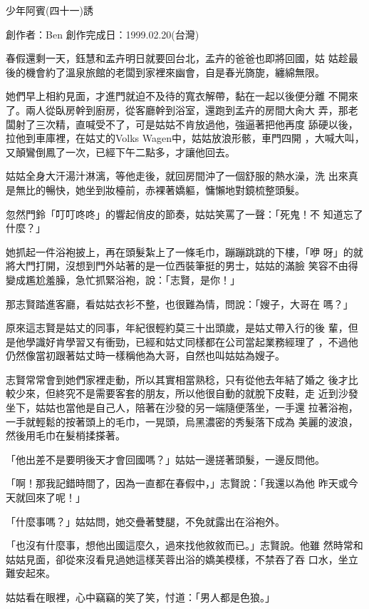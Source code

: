 



少年阿賓(四十一)誘

創作者：Ben
創作完成日：1999.02.20(台灣)


春假還剩一天，鈺慧和孟卉明日就要回台北，孟卉的爸爸也即將回國，姑
姑趁最後的機會約了溫泉旅館的老闆到家裡來幽會，自是春光旖旎，纏綿無限。

她們早上相約見面，才進門就迫不及待的寬衣解帶，黏在一起以後便分離
不開來了。兩人從臥房幹到廚房，從客廳幹到浴室，還跑到孟卉的房間大肏大
弄，那老闆射了三次精，直喊受不了，可是姑姑不肯放過他，強逼著把他再度
舔硬以後，拉他到車庫裡，在姑丈的Volks Wagen中，姑姑放浪形骸，車門四開
，大喊大叫，又顛鸞倒鳳了一次，已經下午二點多，才讓他回去。

姑姑全身大汗湯汁淋漓，等他走後，就回房間沖了一個舒服的熱水澡，洗
出來真是無比的暢快，她坐到妝檯前，赤裸著嬌軀，慵懶地對鏡梳整頭髮。

忽然門鈴「叮叮咚咚」的響起俏皮的節奏，姑姑笑罵了一聲：「死鬼！不
知道忘了什麼？」

她抓起一件浴袍披上，再在頭髮紮上了一條毛巾，蹦蹦跳跳的下樓，「咿
呀」的就將大門打開，沒想到門外站著的是一位西裝筆挺的男士，姑姑的滿臉
笑容不由得變成尷尬羞臊，急忙抓緊浴袍，說：「志賢，是你！」

那志賢踏進客廳，看姑姑衣衫不整，也很難為情，問說：「嫂子，大哥在
嗎？」

原來這志賢是姑丈的同事，年紀很輕約莫三十出頭歲，是姑丈帶入行的後
輩，但是他學識好肯學習又有衝勁，已經和姑丈同樣都在公司當起業務經理了
，不過他仍然像當初跟著姑丈時一樣稱他為大哥，自然也叫姑姑為嫂子。

志賢常常會到她們家裡走動，所以其實相當熟稔，只有從他去年結了婚之
後才比較少來，但終究不是需要客套的朋友，所以他很自動的就脫下皮鞋，走
近到沙發坐下，姑姑也當他是自己人，陪著在沙發的另一端隨便落坐，一手還
拉著浴袍，一手就輕鬆的按著頭上的毛巾，一晃頭，烏黑濃密的秀髮落下成為
美麗的波浪，然後用毛巾在髮梢揉搽著。

「他出差不是要明後天才會回國嗎？」姑姑一邊搓著頭髮，一邊反問他。

「啊！那我記錯時間了，因為一直都在春假中，」志賢說：「我還以為他
昨天或今天就回來了呢！」

「什麼事嗎？」姑姑問，她交疊著雙腿，不免就露出在浴袍外。

「也沒有什麼事，想他出國這麼久，過來找他敘敘而已。」志賢說。他雖
然時常和姑姑見面，卻從來沒看見過她這樣芙蓉出浴的嬌美模樣，不禁吞了吞
口水，坐立難安起來。

姑姑看在眼裡，心中竊竊的笑了笑，忖道：「男人都是色狼。」


